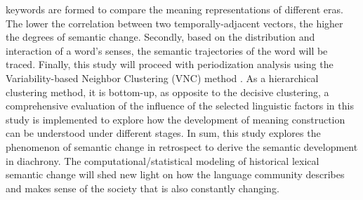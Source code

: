 keywords are formed to compare the meaning representations of different eras. The lower the correlation between two temporally-adjacent vectors, the higher the degrees of semantic change. Secondly, based on the distribution and interaction of a word's senses, the semantic trajectories of the word will be traced. Finally, this study will proceed with periodization analysis using the Variability-based Neighbor Clustering (VNC) method \parencite{gries2012variability}. As a hierarchical clustering method, it is bottom-up, as opposite to the decisive clustering, a comprehensive evaluation of the influence of the selected linguistic factors in this study is implemented to explore how the development of meaning construction can be understood under different stages. In sum, this study explores the phenomenon of semantic change in retrospect to derive the semantic development in diachrony. The computational/statistical modeling of historical lexical semantic change will shed new light on how the language community describes and makes sense of the society that is also constantly changing.


